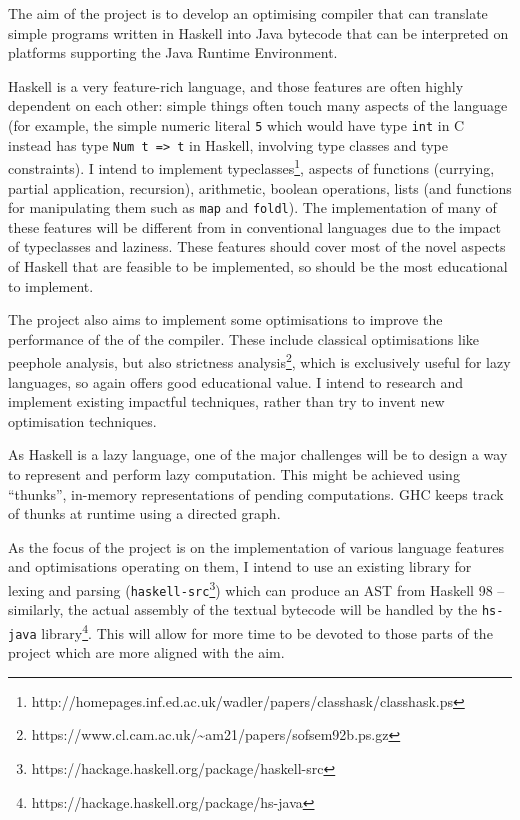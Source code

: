 \documentclass[12pt]{article}
\newcommand\haskell[1]{\texttt{#1}}
\newcommand\monospace[1]{\texttt{#1}}
\begin{document}
The aim of the project is to develop an optimising compiler that can translate simple programs written in Haskell into
Java bytecode that can be interpreted on platforms supporting the Java Runtime Environment.

Haskell is a very feature-rich language, and those features are often highly dependent on each other: simple things
often touch many aspects of the language (for example, the simple numeric literal \haskell{5} which would have type
\texttt{int} in C instead has type \haskell{Num t => t} in Haskell, involving type classes and type constraints).
I intend to implement typeclasses\footnote{http://homepages.inf.ed.ac.uk/wadler/papers/classhask/classhask.ps}, aspects
of functions (currying, partial application, recursion), arithmetic, boolean operations, lists (and functions for
manipulating them such as \haskell{map} and \haskell{foldl}). The implementation of many of these features will be
different from in conventional languages due to the impact of typeclasses and laziness. These features should cover most
of the novel aspects of Haskell that are feasible to be implemented, so should be the most educational to implement.

The project also aims to implement some optimisations to improve the performance of the of the compiler. These
include classical optimisations like peephole analysis, but also strictness
analysis\footnote{https://www.cl.cam.ac.uk/\~{}am21/papers/sofsem92b.ps.gz}, which is exclusively useful for lazy
languages, so again offers good educational value. I intend to research and implement existing impactful techniques,
rather than try to invent new optimisation techniques.

As Haskell is a lazy language, one of the major challenges will be to design a way to represent and perform lazy
computation. This might be achieved using ``thunks'', in-memory representations of pending computations. GHC keeps track
of thunks at runtime using a directed graph.

As the focus of the project is on the implementation of various language features and optimisations operating on them, I
intend to use an existing library for lexing and parsing
(\monospace{haskell-src}\footnote{https://hackage.haskell.org/package/haskell-src}) which can produce an AST from
Haskell 98 -- similarly, the actual assembly of the textual bytecode will be handled by the \monospace{hs-java}
library\footnote{https://hackage.haskell.org/package/hs-java}. This will allow for more time to be devoted to those
parts of the project which are more aligned with the aim.
\end{document}

